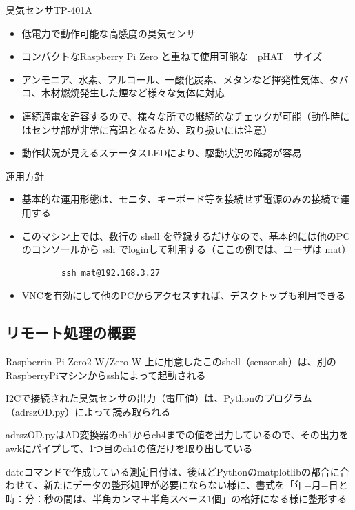 \documentclass[12pt,a4paper,uplatex]{jsbook}
\begin{document}
臭気センサTP-401A

\begin{itemize}
	\item 低電力で動作可能な高感度の臭気センサ
	\item コンパクトなRaspberry Pi Zero と重ねて使用可能な　pHAT　サイズ
	\item アンモニア、水素、アルコール、一酸化炭素、メタンなど揮発性気体、タバコ、木材燃焼発生した煙など様々な気体に対応
	\item 連続通電を許容するので、様々な所での継続的なチェックが可能（動作時にはセンサ部が非常に高温となるため、取り扱いには注意）
	\item 動作状況が見えるステータスLEDにより、駆動状況の確認が容易
\end{itemize}

\newpage
運用方針

\begin{itemize}
	\item 基本的な運用形態は、モニタ、キーボード等を接続せず電源のみの接続で運用する
	\item このマシン上では、数行の shell を登録するだけなので、基本的には他のPCのコンソールから ssh でloginして利用する（ここの例では、ユーザは mat）
	\begin{verbatim}
		ssh mat@192.168.3.27
	\end{verbatim}
	\item VNCを有効にして他のPCからアクセスすれば、デスクトップも利用できる
\end{itemize}

\subsection{リモート処理の概要}

	Raspberrin Pi Zero2 W/Zero W  上に用意したこのshell（sensor.sh）は、別のRaspberryPiマシンからsshによって起動される
	
	I2Cで接続された臭気センサの出力（電圧値）は、Pythonのプログラム（adrszOD.py）によって読み取られる
	
	adrszOD.pyはAD変換器のch1からch4までの値を出力しているので、その出力をawkにパイプして、1つ目のch1の値だけを取り出している
	
	dateコマンドで作成している測定日付は、後ほどPythonのmatplotlibの都合に合わせて、新たにデータの整形処理が必要にならない様に、書式を「年−月−日と時：分：秒の間は、半角カンマ＋半角スペース1個」の格好になる様に整形する
	
\end{document}
